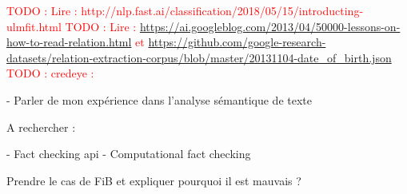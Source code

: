 \documentclass[12pt]{article}
\newcommand\todo[1]{\textcolor{red}{TODO : #1}}
\begin{document}
\todo{Lire : http://nlp.fast.ai/classification/2018/05/15/introducting-ulmfit.html}
\todo{Lire : \url{https://ai.googleblog.com/2013/04/50000-lessons-on-how-to-read-relation.html} et \url{https://github.com/google-research-datasets/relation-extraction-corpus/blob/master/20131104-date_of_birth.json}}
\todo{credeye : \cite{popat2018credeye}}

- Parler de mon expérience dans l'analyse sémantique de texte

A rechercher : 

- Fact checking api
- Computational fact checking 

Prendre le cas de FiB et expliquer pourquoi il est mauvais ?

\clearpage

\printbibliography[
heading=bibintoc,
title={Bibliographie}
]

\clearpage


\end{document}
